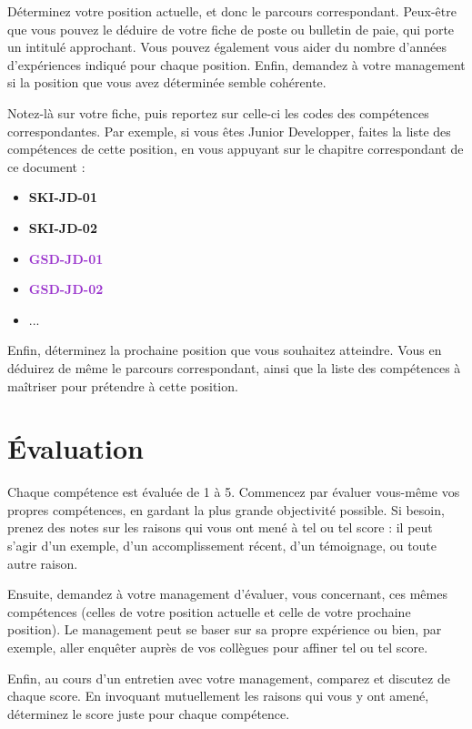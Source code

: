\documentclass[a4paper, french, openany, 12pt]{book}
\newcommand\dex[1]{\textcolor{BrickRed}{\textbf{\uppercase{ski-{#1}}}}}
\newcommand\str[1]{\textcolor{DarkOrchid}{\textbf{\uppercase{gsd-{#1}}}}}
\begin{document}
\begin{multicols}{2}
  Déterminez votre position actuelle, et donc le parcours correspondant.
  Peux-être que vous pouvez le déduire de votre fiche de poste ou bulletin de paie, qui porte un intitulé approchant.
  Vous pouvez également vous aider du nombre d'années d'expériences indiqué pour chaque position.
  Enfin, demandez à votre management si la position que vous avez déterminée semble cohérente.

  Notez-là sur votre fiche, puis reportez sur celle-ci les codes des compétences correspondantes.
  Par exemple, si vous êtes Junior Developper, faites la liste des compétences de cette position, en vous appuyant sur
  le chapitre correspondant de ce document :

  \begin{itemize}
    \item \dex{jd-01}
    \item \dex{jd-02}
    \item \str{jd-01}
    \item \str{jd-02}
    \item ...
  \end{itemize}
  
  Enfin, déterminez la prochaine position que vous souhaitez atteindre.
  Vous en déduirez de même le parcours correspondant, ainsi que la liste des compétences à maîtriser pour prétendre
  à cette position.

  \section*{Évaluation}

  Chaque compétence est évaluée de 1 à 5.
  Commencez par évaluer vous-même vos propres compétences, en gardant la plus grande objectivité possible.
  Si besoin, prenez des notes sur les raisons qui vous ont mené à tel ou tel score : il peut s'agir d'un exemple,
  d'un accomplissement récent, d'un témoignage, ou toute autre raison.

  Ensuite, demandez à votre management d'évaluer, vous concernant, ces mêmes compétences (celles de votre position 
  actuelle et celle de votre prochaine position).
  Le management peut se baser sur sa propre expérience ou bien, par exemple, aller enquêter auprès de vos collègues
  pour affiner tel ou tel score.

  Enfin, au cours d'un entretien avec votre management, comparez et discutez de chaque score.
  En invoquant mutuellement les raisons qui vous y ont amené, déterminez le score juste pour chaque compétence.


\end{multicols}
\end{document}
